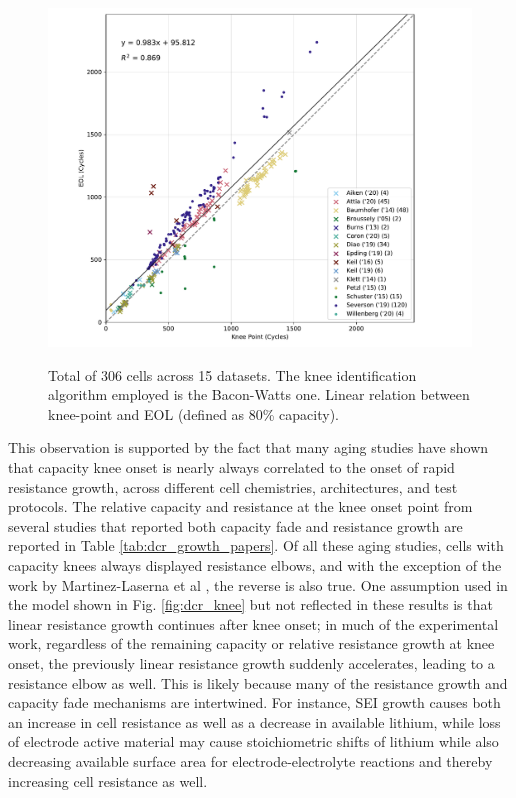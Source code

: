 \documentclass[journal=jpcl, manuscript=article, layout=onecolumn]{achemso}
\begin{document}
\begin{figure}[ht]
\centering
\includegraphics[scale=1.0]{figures/AcrossDatasetsknee-to-EOL}
  \label{fig:kneepoint2EOL}
\caption{Total of 306 cells across 15 datasets. The knee identification algorithm employed is the Bacon-Watts one. Linear relation between knee-point and EOL (defined as 80\% capacity).}
\label{fig:knees2EOL}
\end{figure}

This observation is supported by the fact that many aging studies have shown that capacity knee onset is nearly always correlated to the onset of rapid resistance growth, across different cell chemistries, architectures, and test protocols. The relative capacity and resistance at the knee onset point from several studies that reported both capacity fade and resistance growth are reported in Table \ref{tab:dcr_growth_papers}. Of all these aging studies, cells with capacity knees always displayed resistance elbows, and with the exception of the work by Martinez-Laserna et al \cite{martinez-laserna_technical_2018}, the reverse is also true. One assumption used in the model shown in Fig. \ref{fig:dcr_knee} but not reflected in these results is that linear resistance growth continues after knee onset; in much of the experimental work, regardless of the remaining capacity or relative resistance growth at knee onset, the previously linear resistance growth suddenly accelerates, leading to a resistance elbow as well. This is likely because many of the resistance growth and capacity fade mechanisms are intertwined. For instance, SEI growth causes both an increase in cell resistance as well as a decrease in available lithium, while loss of electrode active material may cause stoichiometric shifts of lithium while also decreasing available surface area for electrode-electrolyte reactions and thereby increasing cell resistance as well.
\end{document}
